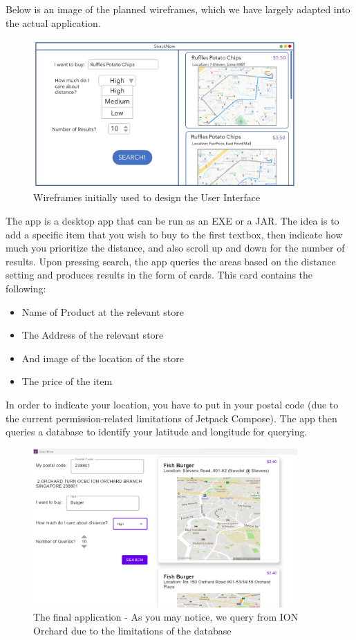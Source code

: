 \documentclass[12pt]{article}
\begin{document}
{Below is an image of the planned wireframes, which we have largely adapted into the actual application.

\begin{figure}[H]
    \centering
    \includegraphics[width=0.9\textwidth]{img/wireframe.png}
    \caption{Wireframes initially used to design the User Interface}
    \label{fig:wireframes}
\end{figure}

The app is a desktop app that can be run as an EXE or a JAR. The idea is to add a specific item that you wish to buy to the first textbox, then indicate how much you prioritize the distance, and also scroll up and down for the number of results. Upon pressing search, the app queries the areas based on the distance setting and produces results in the form of cards. This card contains the following:
\begin{itemize}
    \item Name of Product at the relevant store
    \item The Address of the relevant store
    \item And image of the location of the store
    \item The price of the item
\end{itemize}

In order to indicate your location, you have to put in your postal code (due to the current permission-related limitations of Jetpack Compose). The app then queries a database to identify your latitude and longitude for querying.

\begin{figure}
    \centering
    \includegraphics[width=0.9\textwidth]{img/pa2appImg.png}
    \caption{The final application - As you may notice, we query from ION Orchard due to the limitations of the database}
    \label{fig:appLayout}
\end{figure}


}
\end{document}
